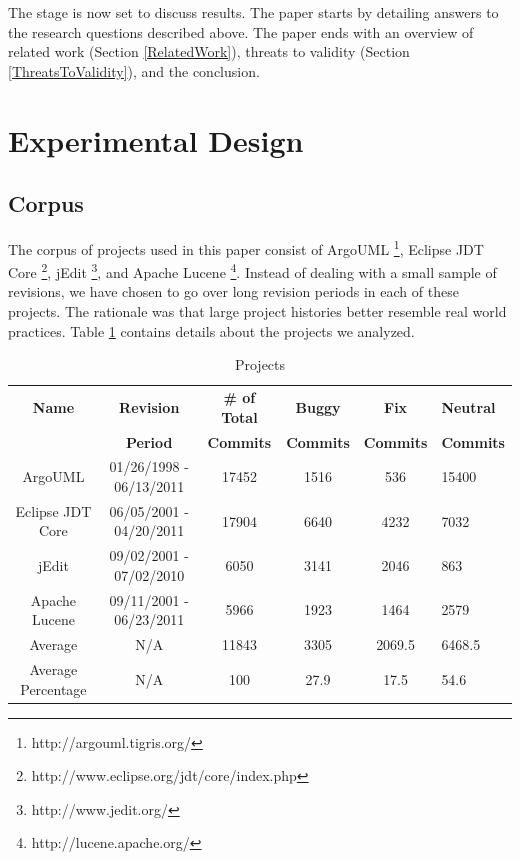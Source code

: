 \documentclass[journal,10pt,draftclsnofoot,twocolumn]{IEEEtran}
\begin{document}
The stage is now set to discuss results. The paper starts by detailing answers to the research questions
described above.
The paper ends with an overview of related work (Section \ref{RelatedWork}),
threats to validity (Section \ref{ThreatsToValidity}), and the conclusion.

\section{Experimental Design}
\subsection{Corpus}
\label{Corpus}
The corpus of projects used in this paper
consist of ArgoUML%
\footnote{http://argouml.tigris.org/%
}, Eclipse JDT Core%
\footnote{http://www.eclipse.org/jdt/core/index.php%
}, jEdit%
\footnote{http://www.jedit.org/%
}, and Apache Lucene%
\footnote{http://lucene.apache.org/%
}. Instead of dealing with a small sample of revisions, we have chosen
to go over long revision periods in each of these projects. The rationale
was that large project histories better resemble real world practices.
Table \ref{tab:projects} contains details about the projects we analyzed.


\begin{table}
\caption{Projects}

\begin{center}
\label{tab:projects}
\setlength{\extrarowheight}{2pt}

\begin{tabular}{cccccp{2.3cm}}
\hline 
\textbf{Name}  & \textbf{Revision}  & \textbf{\# of Total}& \textbf{Buggy}& \textbf{Fix}& \textbf{Neutral}\tabularnewline
& \textbf{Period}  &\textbf{Commits} & \textbf{Commits}&\textbf{Commits}&\textbf{Commits}\tabularnewline

\hline 
ArgoUML  & 01/26/1998 - 06/13/2011  & 17452 & 1516 & 536& 15400\tabularnewline
\hline 
Eclipse JDT Core  & 06/05/2001 - 04/20/2011  & 17904 & 6640 & 4232& 7032\tabularnewline
\hline 
jEdit  & 09/02/2001 - 07/02/2010  & 6050& 3141& 2046& 863\tabularnewline
\hline 
Apache Lucene  & 09/11/2001 - 06/23/2011  & 5966& 1923& 1464& 2579\tabularnewline
\hline
Average &N/A&11843&3305&2069.5&6468.5\tabularnewline
\hline
Average Percentage& N/A&100 &27.9&17.5&54.6\tabularnewline
\hline
\end{tabular}
\end{center}


\end{table}
\end{document}
